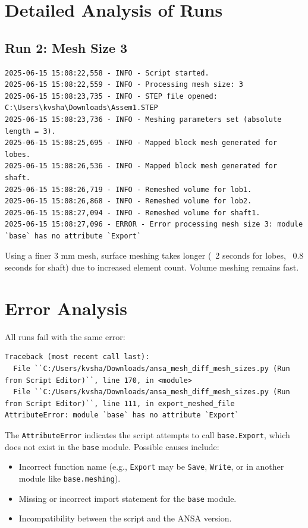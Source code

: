 \documentclass{book}
\begin{document}
\begin{itemize}[leftmargin=*,label=\textbullet]
\section{Detailed Analysis of Runs}

\subsection{Run 2: Mesh Size 3}
\begin{lstlisting}[caption={Run 2: Mesh Size 3}]
2025-06-15 15:08:22,558 - INFO - Script started.
2025-06-15 15:08:22,559 - INFO - Processing mesh size: 3
2025-06-15 15:08:23,735 - INFO - STEP file opened: C:\Users\kvsha\Downloads\Assem1.STEP
2025-06-15 15:08:23,736 - INFO - Meshing parameters set (absolute length = 3).
2025-06-15 15:08:25,695 - INFO - Mapped block mesh generated for lobes.
2025-06-15 15:08:26,536 - INFO - Mapped block mesh generated for shaft.
2025-06-15 15:08:26,719 - INFO - Remeshed volume for lob1.
2025-06-15 15:08:26,868 - INFO - Remeshed volume for lob2.
2025-06-15 15:08:27,094 - INFO - Remeshed volume for shaft1.
2025-06-15 15:08:27,096 - ERROR - Error processing mesh size 3: module `base` has no attribute `Export`
\end{lstlisting}

Using a finer 3 mm mesh, surface meshing takes longer (~2 seconds for lobes, ~0.8 seconds for shaft) due to increased element count. Volume meshing remains fast.



\section{Error Analysis}
All runs fail with the same error:
\begin{lstlisting}[caption={Export Error}]
Traceback (most recent call last):
  File ``C:/Users/kvsha/Downloads/ansa_mesh_diff_mesh_sizes.py (Run from Script Editor)``, line 170, in <module>
  File ``C:/Users/kvsha/Downloads/ansa_mesh_diff_mesh_sizes.py (Run from Script Editor)``, line 111, in export_meshed_file
AttributeError: module `base` has no attribute `Export`
\end{lstlisting}

The \texttt{AttributeError} indicates the script attempts to call \texttt{base.Export}, which does not exist in the \texttt{base} module. Possible causes include:
\begin{itemize}
    \item Incorrect function name (e.g., \texttt{Export} may be \texttt{Save}, \texttt{Write}, or in another module like \texttt{base.meshing}).
    \item Missing or incorrect import statement for the \texttt{base} module.
    \item Incompatibility between the script and the ANSA version.
\end{itemize}


\end{itemize}
\end{document}
